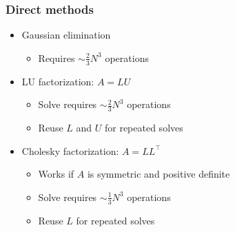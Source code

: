 \begin{frame}
  \frametitle{Direct methods}

  \begin{itemize}
  \item
    Gaussian elimination
    \begin{itemize}
    \item
      Requires $\sim\frac{2}{3}N^3$ operations
    \end{itemize}
  \item
    LU factorization: $A = LU$
    \begin{itemize}
    \item
      Solve requires $\sim\frac{2}{3}N^3$ operations
    \item
      Reuse $L$ and $U$ for repeated solves
    \end{itemize}
  \item
    Cholesky factorization: $A = LL^{\top}$
    \begin{itemize}
    \item
      Works if $A$ is symmetric and positive definite
    \item
      Solve requires $\sim\frac{1}{3}N^3$ operations
    \item
      Reuse $L$ for repeated solves
    \end{itemize}
  \end{itemize}

\end{frame}
